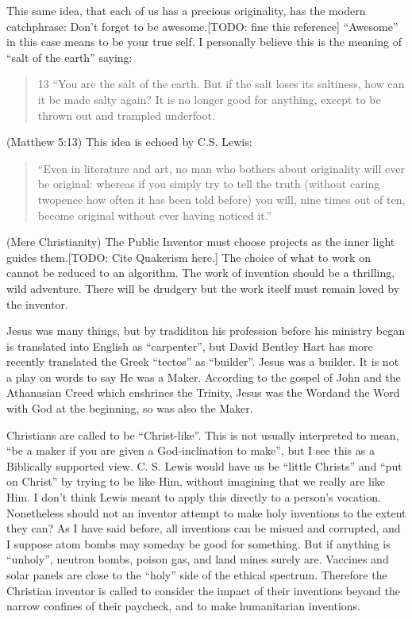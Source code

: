 \documentclass[
	fontsize=10pt, %
	twoside=false, %
	secnumdepth=1, %
]{kaobook}
\begin{document}
This same idea, that each of us has a precious originality,
has the modern catchphrase: Don't forget to be awesome.[TODO: fine this reference]
``Awesome'' in this case means to be your true self.
I personally believe this is the meaning of ``salt of the earth'' saying:
\blockquote{
  13 “You are the salt of the earth. But if the salt loses its saltiness, how can it be made salty again? It is no longer good for anything, except to be thrown out and trampled underfoot.
}(Matthew 5:13)
This idea is echoed by C.S. Lewis:
\blockquote{
  “Even in literature and art, no man who bothers about originality will ever be original: whereas if you simply try to tell the truth
  (without caring twopence how often it has been told before) you will, nine times out of ten, become original without ever having noticed it.”
}(Mere Christianity)
The Public Inventor must choose projects as the inner light guides them.[TODO: Cite Quakerism here.]
The choice of what to work on cannot be reduced to an algorithm.
The work of invention should be a thrilling, wild adventure.
There will be drudgery but the work itself must remain loved
by the inventor.

Jesus was many things, but by tradiditon his profession
before his ministry began is translated into English as ``carpenter'', but
David Bentley Hart has more recently translated the Greek ``tectos'' as
``builder''\cite{hart2017new}. Jesus was a builder. It is not a play on words to say
He was a Maker.
According to the gospel of John and the Athanasian Creed which enshrines
the Trinity, Jesus was the Wordand the Word with God at the beginning,
so was also the Maker.

Christians are called to be ``Christ-like''. This is not usually interpreted to mean,
``be a maker if you are given a God-inclination to make'', but I see this as
a Biblically supported view.
C. S. Lewis would have us be ``little Christs'' and ``put on Christ''
by trying to be like Him, without imagining that we really are like Him.
I don't think Lewis meant to apply this directly to a person's vocation.
Nonetheless should not an inventor attempt to make holy inventions to the
extent they can?
As I have said before, all inventions can be misued and corrupted, and
I suppose atom bombs may someday be good for something.
But if anything is ``unholy'', neutron bombs,
poison gas, and land mines surely are.
Vaccines and solar panels are close to the ``holy'' side of the ethical spectrum.
Therefore the Christian inventor is called to consider the impact of
their inventions beyond the narrow confines of their paycheck,
and to make humanitarian inventions.
\end{document}
